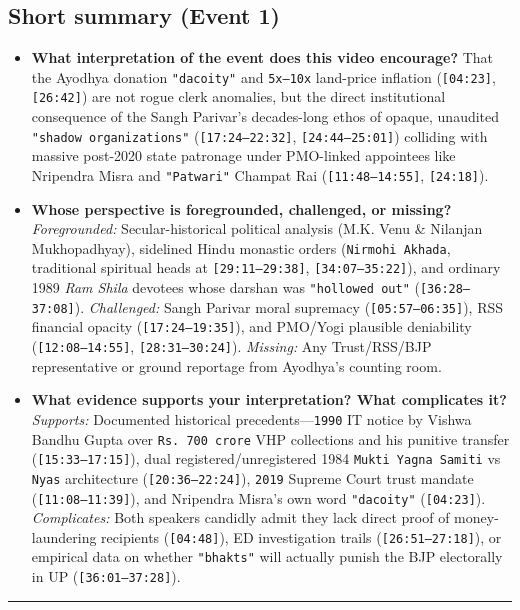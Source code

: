 \documentclass[10pt,a4paper]{article}
\begin{document}
\subsection*{Short summary (Event 1)}
\begin{itemize}[leftmargin=1.5em, itemsep=3pt, topsep=4pt]
  \item \textbf{What interpretation of the event does this video encourage?} That the Ayodhya donation \texttt{"dacoity"} and \texttt{5x--10x} land-price inflation (\texttt{[04:23]}, \texttt{[26:42]}) are not rogue clerk anomalies, but the direct institutional consequence of the Sangh Parivar's decades-long ethos of opaque, unaudited \texttt{"shadow organizations"} (\texttt{[17:24--22:32]}, \texttt{[24:44--25:01]}) colliding with massive post-2020 state patronage under PMO-linked appointees like Nripendra Misra and \texttt{"Patwari"} Champat Rai (\texttt{[11:48--14:55]}, \texttt{[24:18]}).
  \item \textbf{Whose perspective is foregrounded, challenged, or missing?} \textit{Foregrounded:} Secular-historical political analysis (M.K. Venu \& Nilanjan Mukhopadhyay), sidelined Hindu monastic orders (\texttt{Nirmohi Akhada}, traditional spiritual heads at \texttt{[29:11--29:38]}, \texttt{[34:07--35:22]}), and ordinary 1989 \textit{Ram Shila} devotees whose darshan was \texttt{"hollowed out"} (\texttt{[36:28--37:08]}). \textit{Challenged:} Sangh Parivar moral supremacy (\texttt{[05:57--06:35]}), RSS financial opacity (\texttt{[17:24--19:35]}), and PMO/Yogi plausible deniability (\texttt{[12:08--14:55]}, \texttt{[28:31--30:24]}). \textit{Missing:} Any Trust/RSS/BJP representative or ground reportage from Ayodhya's counting room.
  \item \textbf{What evidence supports your interpretation? What complicates it?} \textit{Supports:} Documented historical precedents---\texttt{1990} IT notice by Vishwa Bandhu Gupta over \texttt{Rs.\,700 crore} VHP collections and his punitive transfer (\texttt{[15:33--17:15]}), dual registered/unregistered 1984 \texttt{Mukti Yagna Samiti} vs \texttt{Nyas} architecture (\texttt{[20:36--22:24]}), \texttt{2019} Supreme Court trust mandate (\texttt{[11:08--11:39]}), and Nripendra Misra's own word \texttt{"dacoity"} (\texttt{[04:23]}). \textit{Complicates:} Both speakers candidly admit they lack direct proof of money-laundering recipients (\texttt{[04:48]}), ED investigation trails (\texttt{[26:51--27:18]}), or empirical data on whether \texttt{"bhakts"} will actually punish the BJP electorally in UP (\texttt{[36:01--37:28]}).
\end{itemize}
\vspace{4pt}\noindent\rule{\textwidth}{0.4pt}\vspace{4pt}
\end{document}
